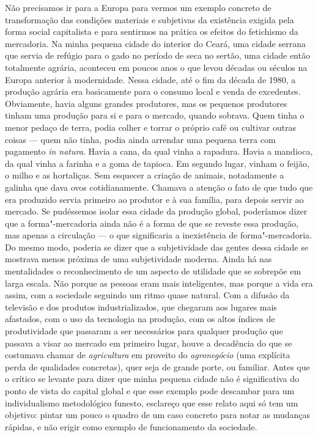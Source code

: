 Não precisamos ir para a Europa para vermos um exemplo concreto de
transformação das condições materiais e subjetivas da existência exigida
pela forma social capitalista e para sentirmos na prática os efeitos do
fetichismo da mercadoria. Na minha pequena cidade do interior do Ceará,
uma cidade serrana que servia de refúgio para o gado no período de seca
no sertão, uma cidade então totalmente agrária, aconteceu em poucos anos
o que levou décadas ou séculos na Europa anterior à modernidade. Nessa
cidade, até o fim da década de 1980, a produção agrária era basicamente
para o consumo local e venda de excedentes. Obviamente, havia alguns
grandes produtores, mas os pequenos produtores tinham uma produção para
si e para o mercado, quando sobrava. Quem tinha o menor pedaço de terra,
podia colher e torrar o próprio café ou cultivar outras coisas --- quem
não tinha, podia ainda arrendar uma pequena terra com pagamento \emph{in
natura}. Havia a cana, da qual vinha a rapadura. Havia a mandioca, da
qual vinha a farinha e a goma de tapioca. Em segundo lugar, vinham o
feijão, o milho e as hortaliças. Sem esquecer a criação de animais,
notadamente a galinha que dava ovos cotidianamente. Chamava a atenção o
fato de que tudo que era produzido servia primeiro ao produtor e à sua
família, para depois servir ao mercado. Se pudéssemos isolar essa cidade
da produção global, poderíamos dizer que a forma"-mercadoria ainda não é
a forma de que se reveste essa produção, mas apenas a circulação --- o
que significaria a inexistência de forma"-mercadoria. Do mesmo modo,
poderia se dizer que a subjetividade das gentes dessa cidade se mostrava
menos próxima de uma subjetividade moderna. Ainda há nas mentalidades o
reconhecimento de um aspecto de utilidade que se sobrepõe em larga
escala. Não porque as pessoas eram mais inteligentes, mas porque a vida
era assim, com a sociedade seguindo um ritmo quase natural. Com a
difusão da televisão e dos produtos industrializados, que chegaram aos
lugares mais afastados, com o uso da tecnologia na produção, com os
altos índices de produtividade que passaram a ser necessários para
qualquer produção que passava a visar ao mercado em primeiro lugar,
houve a decadência do que se costumava chamar de \emph{agricultura} em
proveito do \emph{agronegócio} (uma explícita perda de qualidades
concretas), quer seja de grande porte, ou familiar. Antes que o crítico
se levante para dizer que minha pequena cidade não é significativa do
ponto de vista do capital global e que esse exemplo pode descambar para
um individualismo metodológico funesto, esclareço que esse relato aqui
só tem um objetivo: pintar um pouco o quadro de um caso concreto para
notar as mudanças rápidas, e não erigir como exemplo de funcionamento da
sociedade.

